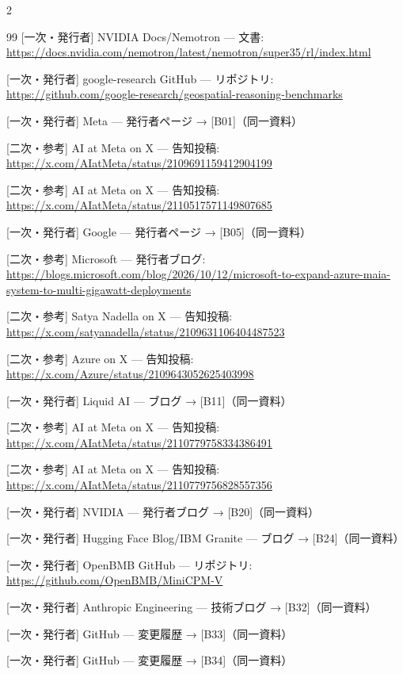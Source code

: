 \documentclass[lualatex,a4paper,10pt]{jlreq}
\begin{document}
\begin{multicols}{2}
\begin{thebibliography}{99}
 [一次・発行者] NVIDIA Docs/Nemotron — 文書: \url{https://docs.nvidia.com/nemotron/latest/nemotron/super35/rl/index.html}

 [一次・発行者] google-research GitHub — リポジトリ: \url{https://github.com/google-research/geospatial-reasoning-benchmarks}

 [一次・発行者] Meta — 発行者ページ → [B01]（同一資料）

 [二次・参考] AI at Meta on X — 告知投稿: \url{https://x.com/AIatMeta/status/2109691159412904199}

 [二次・参考] AI at Meta on X — 告知投稿: \url{https://x.com/AIatMeta/status/2110517571149807685}

 [一次・発行者] Google — 発行者ページ → [B05]（同一資料）

 [二次・参考] Microsoft — 発行者ブログ: \url{https://blogs.microsoft.com/blog/2026/10/12/microsoft-to-expand-azure-maia-system-to-multi-gigawatt-deployments}

 [二次・参考] Satya Nadella on X — 告知投稿: \url{https://x.com/satyanadella/status/2109631106404487523}

 [二次・参考] Azure on X — 告知投稿: \url{https://x.com/Azure/status/2109643052625403998}

 [一次・発行者] Liquid AI — ブログ → [B11]（同一資料）

 [二次・参考] AI at Meta on X — 告知投稿: \url{https://x.com/AIatMeta/status/2110779758334386491}

 [二次・参考] AI at Meta on X — 告知投稿: \url{https://x.com/AIatMeta/status/2110779756828557356}

 [一次・発行者] NVIDIA — 発行者ブログ → [B20]（同一資料）

 [一次・発行者] Hugging Face Blog/IBM Granite — ブログ → [B24]（同一資料）

 [一次・発行者] OpenBMB GitHub — リポジトリ: \url{https://github.com/OpenBMB/MiniCPM-V}

 [一次・発行者] Anthropic Engineering — 技術ブログ → [B32]（同一資料）

 [一次・発行者] GitHub — 変更履歴 → [B33]（同一資料）

 [一次・発行者] GitHub — 変更履歴 → [B34]（同一資料）


\end{thebibliography}
\end{multicols}
\end{document}
